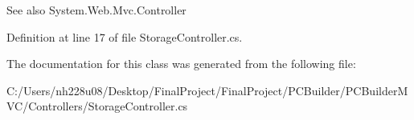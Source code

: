 \begin{DoxySeeAlso}{See also}
System.\+Web.\+Mvc.\+Controller


\end{DoxySeeAlso}


Definition at line 17 of file Storage\+Controller.\+cs.



The documentation for this class was generated from the following file\+:\begin{DoxyCompactItemize}
\item 
C\+:/\+Users/nh228u08/\+Desktop/\+Final\+Project/\+Final\+Project/\+P\+C\+Builder/\+P\+C\+Builder\+M\+V\+C/\+Controllers/Storage\+Controller.\+cs\end{DoxyCompactItemize}
